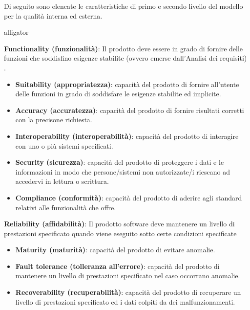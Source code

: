 Di seguito sono elencate le caratteristiche di primo e secondo livello del modello per la qualità interna ed esterna.
\begin{labeling}{alligator}
	\item \textbf{Functionality (funzionalità)}: Il prodotto deve essere in grado di fornire delle funzioni che soddisfino esigenze stabilite (ovvero emerse dall'Analisi dei requisiti) \marginpar{\textcolor{red}{mettere ref a doc}}.
	\begin{itemize}
		\item \textbf{Suitability (appropriatezza)}: capacità del prodotto di fornire all'utente delle funzioni in grado di soddisfare le esigenze stabilite ed implicite. 
		
		\item \textbf{Accuracy (accuratezza)}: capacità del prodotto di fornire risultati corretti con la precisone richiesta. 
		
		\item \textbf{Interoperability (interoperabilità)}: capacità del prodotto di interagire con uno o più sistemi specificati. 
		
		\item \textbf{Security (sicurezza)}: capacità del prodotto di proteggere i dati e le informazioni in modo che persone/sistemi non autorizzate/i riescano ad accedervi in lettura o scrittura.
		
		\item \textbf{Compliance (conformità)}: capacità del prodotto di aderire agli standard relativi alle funzionalità che offre.
	\end{itemize}
	\item \textbf{Reliability (affidabilità)}: Il prodotto software deve mantenere un livello di prestazioni specificato quando viene eseguito sotto certe condizioni specificate
	\begin{itemize}
		\item \textbf{Maturity (maturità)}: capacità del prodotto di evitare anomalie.
		
		\item \textbf{Fault tolerance (tolleranza all'errore)}: capacità del prodotto di mantenere un livello di prestazioni specificato nel caso occorrano anomalie.
		
		\item \textbf{Recoverability (recuperabilità)}: capacità del prodotto di recuperare un livello di prestazioni specificato ed i dati colpiti da dei malfunzionamenti.
		

\end{itemize}
\end{labeling}
